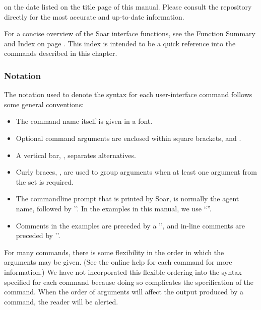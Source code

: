 \hspace{2em}

on the date listed on the title page of this manual.  Please consult
the repository directly for the most accurate and up-to-date information.

For a concise overview of the Soar interface functions, see the Function
Summary and Index on page \pageref{func-sum}. This index is intended to be a
quick reference into the commands described in this chapter.

\subsubsection*{Notation}


The notation used to denote the syntax for each user-interface command follows
some general conventions:\vspace{-12pt}
\begin{itemize}
\item The command name itself is given in a  font.\vspace{-8pt}
\item Optional command arguments are enclosed within square brackets,
	\soar{[} and \soar{]}.\vspace{-8pt}
\item A vertical bar, \soar{|}, separates alternatives.\vspace{-8pt}
\item Curly braces, \soar{\{\}}, are used to group arguments when at least
one argument from the set is required.
\item The commandline prompt that is printed by Soar, is normally
the agent name, followed by '\soar{>}'.  In the examples in this manual, 
we use ``''.
\item Comments in the examples are preceded by
a '\soar{\#}', and in-line comments are preceded by '\soar{;\#}'.
\end{itemize}

For many commands, there is some flexibility in the order in which the
arguments may be given. (See the online help for each command for more
information.)  We have not incorporated this flexible ordering into the syntax
specified for each command because doing so complicates the specification of
the command.  When the order of arguments will affect the output
produced by a command, the reader will be alerted.

